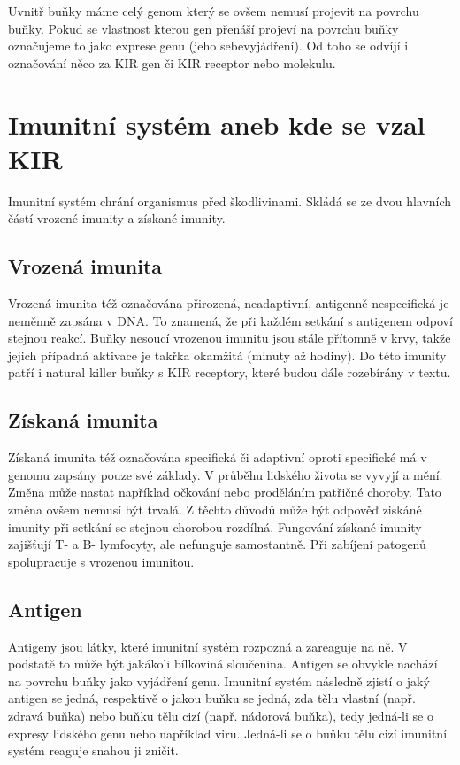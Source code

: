 \documentclass[czech,DP]{thesiskiv}
\begin{document}
Uvnitř buňky máme celý genom který se ovšem nemusí projevit na povrchu buňky. Pokud se vlastnost kterou gen přenáší projeví na povrchu buňky označujeme to jako exprese genu (jeho sebevyjádření). Od toho se odvíjí i označování něco za KIR gen či KIR receptor nebo molekulu.


\section{Imunitní systém aneb kde se vzal KIR}
Imunitní systém chrání organismus před škodlivinami. Skládá se ze dvou hlavních částí vrozené imunity a získané imunity. 

\subsection{Vrozená imunita}
Vrozená imunita též označována přirozená, neadaptivní, antigenně nespecifická je neměnně zapsána v DNA. To znamená, že při každém setkání s antigenem odpoví stejnou reakcí. Buňky nesoucí vrozenou imunitu jsou stále přítomně v krvy, takže jejich případná aktivace je takřka okamžitá (minuty až hodiny). Do této imunity patří i natural killer buňky s KIR receptory, které budou dále rozebírány v textu. 

\subsection{Získaná imunita}
Získaná imunita též označována specifická či adaptivní oproti specifické má v genomu zapsány pouze své základy. V průběhu lidského života se vyvyjí a mění. Změna může nastat například očkování nebo proděláním patřičné choroby. Tato změna ovšem nemusí být trvalá. Z těchto důvodů může být odpověď ziskáné imunity při setkání se stejnou chorobou rozdílná. Fungování získané imunity zajišťují T- a B- lymfocyty, ale nefunguje samostantně. Při zabíjení patogenů spolupracuje s vrozenou imunitou.

\subsection{Antigen}
Antigeny jsou látky, které imunitní systém rozpozná a zareaguje na ně. V podstatě to může být jakákoli bílkoviná sloučenina. Antigen se obvykle nachází na povrchu buňky jako vyjádření genu. Imunitní systém následně zjistí o jaký antigen se jedná, respektivě o jakou buňku se jedná, zda tělu vlastní (např. zdravá buňka) nebo buňku tělu cizí (např. nádorová buňka), tedy jedná-li se o expresy lidského genu nebo například viru. Jedná-li se o buňku tělu cizí imunitní systém reaguje snahou ji zničit.
\end{document}
